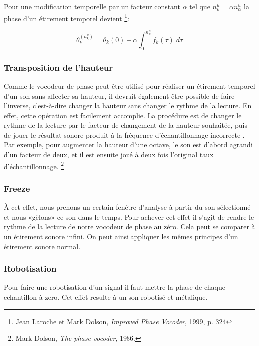 Pour une modification temporelle par un facteur constant $\alpha$ tel que $n_k^u = \alpha n_\alpha^u$ la phase d'un étirement temporel devient \footnote{Jean Laroche et Mark Dolson, \textit{Improved Phase Vocoder}, 1999, p. 324 \nocite{DoLa99}}:
    
    \begin{equation}
        \theta_k^(n_k^u) = \theta_k(0) + \alpha \int_0^{n_k^u}  f_k (\tau) \; d\tau
    \end{equation}

    \subsubsection{Transposition de l'hauteur}

Comme le vocodeur de phase peut être utilisé pour réaliser un étirement temporel d'un son sans affecter sa hauteur, il devrait également être possible de faire l'inverse, c’est-à-dire changer la hauteur sans changer le rythme de la lecture. En effet, cette opération est facilement accomplie. La procédure est de changer le rythme de la lecture par le facteur de changement de la hauteur souhaitée, puis de jouer le résultat sonore produit à la fréquence d'échantillonnage \guillemotleft incorrecte \guillemotright. Par exemple, pour augmenter la hauteur d’une octave, le son est d'abord agrandi d'un facteur de deux, et il est ensuite joué à deux fois l'original taux d'échantillonnage. \footnote{Mark Dolson, \textit{ The phase vocoder}, 1986.}

    \subsubsection{Freeze}

À cet effet, nous prenons un certain fenêtre d’analyse à partir du son sélectionné et nous «gèlons» ce son dans le temps. Pour achever cet effet il s'agit de rendre le rythme de la lecture de notre vocodeur de phase au zéro. Cela peut se comparer à un étirement sonore infini. On peut ainsi appliquer les mêmes principes d'un étirement sonore normal.

    \subsubsection{Robotisation}

Pour faire une robotisation d'un signal il faut mettre la phase de chaque echantillon à zero. Cet effet resulte à un son robotisé et métalique.

